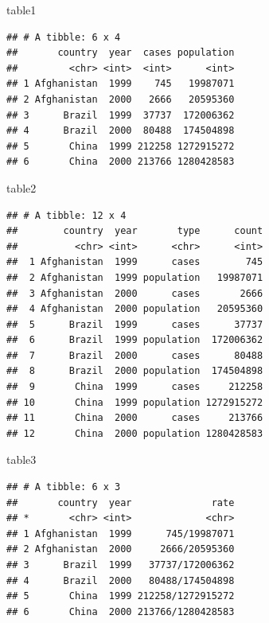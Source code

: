 \documentclass[]{book}
\newenvironment{Shaded}{\begin{snugshade}}{\end{snugshade}}
\newcommand{\NormalTok}[1]{#1}
\begin{document}
\begin{Shaded}
\begin{Highlighting}[]
\NormalTok{table1}
\end{Highlighting}
\end{Shaded}

\begin{verbatim}
## # A tibble: 6 x 4
##       country  year  cases population
##         <chr> <int>  <int>      <int>
## 1 Afghanistan  1999    745   19987071
## 2 Afghanistan  2000   2666   20595360
## 3      Brazil  1999  37737  172006362
## 4      Brazil  2000  80488  174504898
## 5       China  1999 212258 1272915272
## 6       China  2000 213766 1280428583
\end{verbatim}

\begin{Shaded}
\begin{Highlighting}[]
\NormalTok{table2}
\end{Highlighting}
\end{Shaded}

\begin{verbatim}
## # A tibble: 12 x 4
##        country  year       type      count
##          <chr> <int>      <chr>      <int>
##  1 Afghanistan  1999      cases        745
##  2 Afghanistan  1999 population   19987071
##  3 Afghanistan  2000      cases       2666
##  4 Afghanistan  2000 population   20595360
##  5      Brazil  1999      cases      37737
##  6      Brazil  1999 population  172006362
##  7      Brazil  2000      cases      80488
##  8      Brazil  2000 population  174504898
##  9       China  1999      cases     212258
## 10       China  1999 population 1272915272
## 11       China  2000      cases     213766
## 12       China  2000 population 1280428583
\end{verbatim}

\begin{Shaded}
\begin{Highlighting}[]
\NormalTok{table3}
\end{Highlighting}
\end{Shaded}

\begin{verbatim}
## # A tibble: 6 x 3
##       country  year              rate
## *       <chr> <int>             <chr>
## 1 Afghanistan  1999      745/19987071
## 2 Afghanistan  2000     2666/20595360
## 3      Brazil  1999   37737/172006362
## 4      Brazil  2000   80488/174504898
## 5       China  1999 212258/1272915272
## 6       China  2000 213766/1280428583
\end{verbatim}
\end{document}
